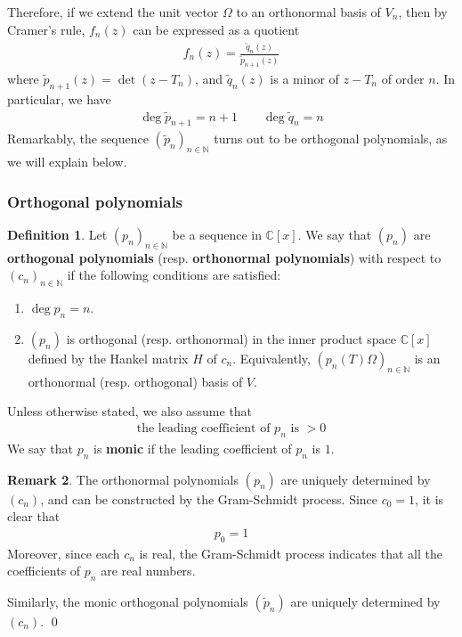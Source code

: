 \documentclass[12pt,b5paper,notitlepage]{article}
\theoremstyle{definition}
\newtheorem{df}{Definition}[subsection]
\newtheorem{rem}[df]{Remark}
\theoremstyle{plain}
\newcommand{\wtd}{\widetilde}
\newcommand{\Cbb}{\mathbb C}
\newcommand{\Nbb}{\mathbb N}
\numberwithin{equation}{section}
\begin{document}
Therefore, if we extend the unit vector $\Omega$ to an orthonormal basis of $V_n$, then by Cramer's rule, $f_n(z)$ can be expressed as a quotient 
\begin{align}\label{eq104}
f_n(z)=\frac{\wtd q_n(z)}{\wtd p_{n+1}(z)}
\end{align}
where $\wtd p_{n+1}(z)=\det(z-T_n)$, and $\wtd q_n(z)$ is a minor of $z-T_n$ of order $n$. In particular, we have
\begin{align*}
\deg\wtd p_{n+1}=n+1\qquad \deg\wtd q_n=n
\end{align*}
Remarkably, the sequence $(\wtd p_n)_{n\in\Nbb}$ turns out to be orthogonal polynomials, as we will explain below.



\subsubsection{Orthogonal polynomials}


\begin{df}\label{lb190}
Let $(p_n)_{n\in\Nbb}$ be a sequence in $\Cbb[x]$. We say that $(p_n)$ are \textbf{orthogonal polynomials} (resp. \textbf{orthonormal polynomials})  with respect to $(c_n)_{n\in\Nbb}$ if the following conditions are satisfied:
\begin{enumerate}[label=(\arabic*)]
\item $\deg p_n=n$.
\item $(p_n)$ is orthogonal (resp. orthonormal) in the inner product space $\Cbb[x]$ defined by the Hankel matrix $H$ of $c_n$. Equivalently, $(p_n(T)\Omega)_{n\in\Nbb}$ is an orthonormal (resp. orthogonal) basis of $V$.
\end{enumerate}
Unless otherwise stated, we also assume that
\begin{align}
\text{the leading coefficient of $p_n$ is $>0$}
\end{align}
We say that $p_n$ is \textbf{monic} if the leading coefficient of $p_n$ is $1$.
\end{df}

\begin{rem}
The orthonormal polynomials $(p_n)$ are uniquely determined by $(c_n)$, and can be constructed by the Gram-Schmidt process. Since $c_0=1$, it is clear that
\begin{align*}
p_0=1
\end{align*}
Moreover, since each $c_n$ is real, the Gram-Schmidt process indicates that all the coefficients of $p_n$ are real numbers.

Similarly, the monic orthogonal polynomials $(\wtd p_n)$ are uniquely determined by $(c_n)$.   \hfill\qed
\end{rem}
\end{document}
